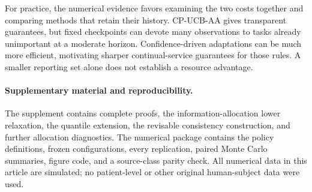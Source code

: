 For practice, the numerical evidence favors examining the two costs together
and comparing methods that retain their history. CP-UCB-AA gives transparent
guarantees, but fixed checkpoints can devote many observations to tasks already
unimportant at a moderate horizon. Confidence-driven adaptations can be much
more efficient, motivating sharper continual-service guarantees for those
rules. A smaller reporting set alone does not establish a resource advantage.

\paragraph{Supplementary material and reproducibility.}
The supplement contains complete proofs, the information-allocation lower
relaxation, the quantile extension, the revisable consistency construction,
and further allocation diagnostics. The numerical package contains the policy
definitions, frozen configurations, every replication, paired Monte Carlo
summaries, figure code, and a source-class parity check. All numerical data in
this article are simulated; no patient-level or other original human-subject
data were used.
